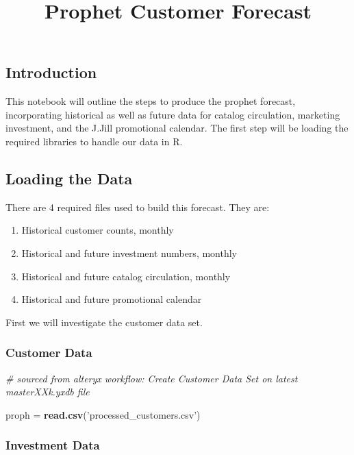 \documentclass[]{article}
\title{Prophet Customer Forecast}
\author{}
\date{}
\newenvironment{Shaded}{\begin{snugshade}}{\end{snugshade}}
\newcommand{\KeywordTok}[1]{\textcolor[rgb]{0.13,0.29,0.53}{\textbf{{#1}}}}
\newcommand{\StringTok}[1]{\textcolor[rgb]{0.31,0.60,0.02}{{#1}}}
\newcommand{\CommentTok}[1]{\textcolor[rgb]{0.56,0.35,0.01}{\textit{{#1}}}}
\newcommand{\NormalTok}[1]{{#1}}
\providecommand{\tightlist}{%
  \setlength{\itemsep}{0pt}\setlength{\parskip}{0pt}}
\begin{document}
\maketitle

\subsection{Introduction}\label{introduction}

This notebook will outline the steps to produce the prophet forecast,
incorporating historical as well as future data for catalog circulation,
marketing investment, and the J.Jill promotional calendar. The first
step will be loading the required libraries to handle our data in R.

\subsection{Loading the Data}\label{loading-the-data}

There are 4 required files used to build this forecast. They are:

\begin{enumerate}
\def\labelenumi{\arabic{enumi}.}
\tightlist
\item
  Historical customer counts, monthly
\item
  Historical and future investment numbers, monthly
\item
  Historical and future catalog circulation, monthly
\item
  Historical and future promotional calendar
\end{enumerate}

First we will investigate the customer data set.

\subsubsection{Customer Data}\label{customer-data}

\begin{Shaded}
\begin{Highlighting}[]
\CommentTok{# sourced from alteryx workflow: Create Customer Data Set on latest masterXXk.yxdb file}

\NormalTok{proph =}\StringTok{ }\KeywordTok{read.csv}\NormalTok{(}\StringTok{'processed_customers.csv'}\NormalTok{)}
\end{Highlighting}
\end{Shaded}

\subsubsection{Investment Data}\label{investment-data}
\end{document}
